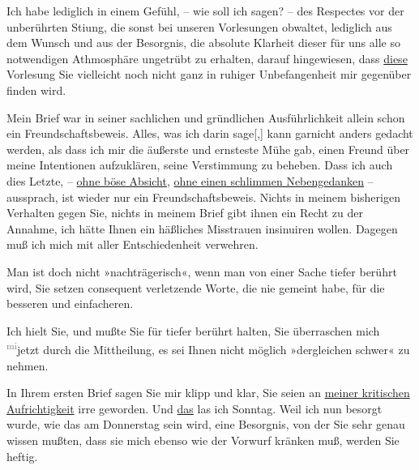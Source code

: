 \pstart
           Ich habe lediglich in einem Gefühl, – wie soll ich sagen? – des Respectes vor der
               unberührten Sti{\geminationm}ung, die sonst bei unseren Vorlesungen
               obwaltet, lediglich aus dem Wunsch und aus der Besorgnis, die absolute Klarheit
               dieser für uns alle so notwendigen Athmosphäre ungetrübt zu erhalten, darauf
               hingewiesen, dass \uline{diese} Vorlesung Sie vielleicht noch
               nicht ganz in ruhiger Unbefangenheit mir gegenüber finden wird.\pend
           
\pstart
           Mein Brief war in seiner sachlichen und gründlichen Ausführlichkeit allein schon ein
               Freundschaftsbeweis. Alles, was ich darin sage{[},{]} kann garnicht
               anders gedacht werden, als dass ich mir die äußerste und ernsteste Mühe gab, einen
               Freund über meine {\pb}Intentionen
               aufzuklären, seine Verstimmung zu beheben. Dass ich auch dies Letzte, – \uline{ohne böse Absicht}, \uline{ohne
                  einen schlimmen Nebengedanken} – aussprach, ist wieder nur ein
               Freundschaftsbeweis. Nichts in meinem bisherigen Verhalten gegen Sie, nichts in
               meinem Brief gibt ihnen ein Recht zu der Annahme, ich hätte Ihnen ein häßliches
               Misstrauen insinuiren wollen. Dagegen muß ich mich mit aller Entschiedenheit
               verwehren.\pend
           
\pstart
           Man ist doch nicht »nachträgerisch«, wenn man von einer Sache tiefer berührt wird,
               Sie setzen consequent verletzende Worte, die  nie
               gemeint habe, für die besseren und einfacheren.\pend
           
\pstart
           Ich hielt Sie, und mußte Sie für tiefer berührt halten, Sie überraschen mich \substVorne{}\textsuperscript{\textcolor{gray}{mi}}\substDazwischen{}jetzt\substHinten{} durch die Mittheilung, es sei Ihnen nicht möglich »dergleichen schwer« zu
               nehmen.\pend
           
\pstart
           In Ihrem ersten Brief sagen Sie mir klipp und klar, Sie seien an \uline{meiner kritischen Aufrichtigkeit} irre geworden. Und \uline{das} las ich Sonntag.
               Weil ich nun besorgt wurde, wie das am Donnerstag sein
               wird, eine Besorgnis, von der Sie sehr genau wissen mußten, dass sie mich ebenso wie
               der Vorwurf kränken muß, werden Sie heftig.\pend
           
